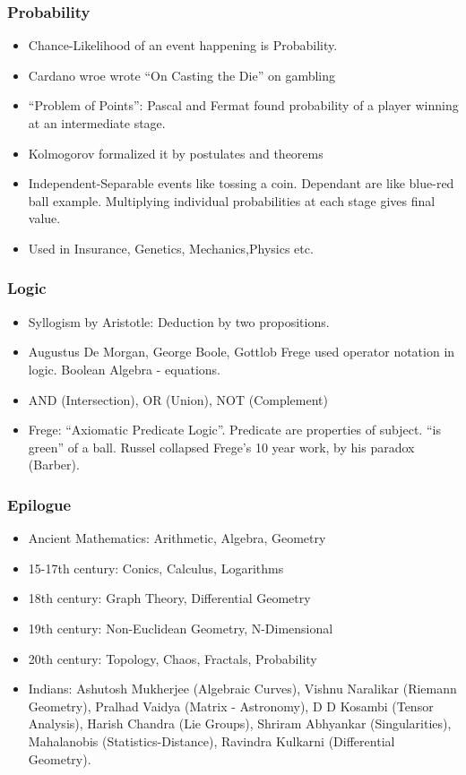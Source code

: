 \begin{frame}[fragile]
\frametitle{Probability}
\begin{itemize}[label=\textbullet,noitemsep,nolistsep]
\item Chance-Likelihood of an event happening is Probability.
\item Cardano wroe wrote ``On Casting the Die'' on gambling
\item ``Problem of Points'': Pascal and Fermat found probability of a player winning at an intermediate stage.
\item Kolmogorov formalized it by postulates and theorems
\item Independent-Separable events like tossing a coin. Dependant are like blue-red ball example. Multiplying individual probabilities at each stage gives final value.
\item Used in Insurance, Genetics, Mechanics,Physics etc.
\end{itemize}
\end{frame}

\begin{frame}[fragile]
\frametitle{Logic}
\begin{itemize}[label=\textbullet,noitemsep,nolistsep]
\item Syllogism by Aristotle: Deduction by two propositions.
\item Augustus De Morgan, George Boole, Gottlob Frege used operator notation in logic. Boolean Algebra - equations.
\item AND (Intersection), OR (Union), NOT (Complement)
\item Frege: ``Axiomatic Predicate Logic''. Predicate are properties of subject. ``is green'' of a ball. Russel collapsed Frege's 10 year work, by his paradox (Barber).
\end{itemize}
\end{frame}

\begin{frame}[fragile]
\frametitle{Epilogue}

\begin{itemize}[label=\textbullet,noitemsep,nolistsep]
\item Ancient Mathematics: Arithmetic, Algebra, Geometry
\item 15-17th century: Conics, Calculus, Logarithms
\item 18th century: Graph Theory, Differential Geometry
\item 19th century: Non-Euclidean Geometry, N-Dimensional
\item 20th century: Topology, Chaos, Fractals, Probability
\item Indians: Ashutosh Mukherjee (Algebraic Curves), Vishnu Naralikar (Riemann Geometry), Pralhad Vaidya (Matrix - Astronomy), D D Kosambi (Tensor Analysis), Harish Chandra (Lie Groups), Shriram Abhyankar (Singularities), Mahalanobis  (Statistics-Distance), Ravindra Kulkarni (Differential Geometry).
\end{itemize}
\end{frame}



